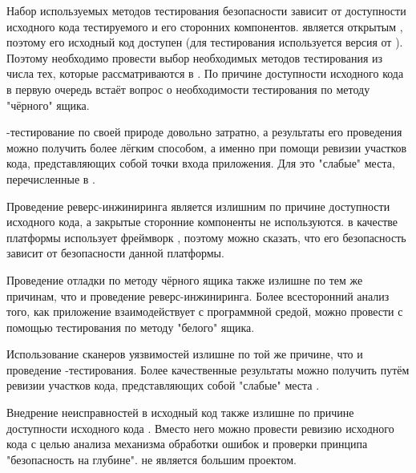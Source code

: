 %
Набор используемых методов тестирования безопасности  зависит от доступности исходного кода тестируемого  и его сторонних компонентов.
%
\PeerHood является открытым , поэтому его исходный код доступен  (для тестирования используется версия  от ). 
%
Поэтому необходимо провести выбор необходимых методов тестирования из числа тех, которые рассматриваются в .
%
По причине доступности исходного кода в первую очередь встаёт вопрос о необходимости тестирования по методу "чёрного" ящика. 



%
\Fuzz-тестирование по своей природе довольно затратно, а результаты его проведения можно получить более лёгким способом, а именно при помощи ревизии участков кода, представляющих собой точки входа приложения.
%
Для \PeerHood это "слабые" места, перечисленные в . 

%
Проведение реверс-инжиниринга является излишним по причине доступности исходного кода, а закрытые сторонние компоненты не используются. 
%
\PeerHood в качестве платформы использует фреймворк \Qt {}, поэтому можно сказать, что его безопасность зависит от безопасности данной платформы. 

%
Проведение отладки по методу чёрного ящика также излишне по тем же причинам, что и проведение реверс-инжиниринга. 
%
Более всесторонний анализ того, как приложение взаимодействует с программной средой, можно провести с помощью тестирования по методу "белого" ящика. 
%

%
Использование сканеров уязвимостей излишне по той же причине, что и проведение \fuzz-тестирования. 
%
Более качественные результаты можно получить путём ревизии участков кода, представляющих собой "слабые" места \PeerHood. 

%
Внедрение неисправностей в исходный код также излишне по причине доступности исходного кода \PeerHood. 
%
Вместо него можно провести ревизию исходного кода с целью анализа механизма обработки ошибок и проверки принципа "безопасность на глубине". 
%
\PeerHood не является большим проектом. 

